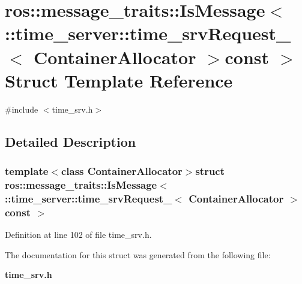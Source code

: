 \section{ros\-:\-:message\-\_\-traits\-:\-:\-Is\-Message$<$ \-:\-:time\-\_\-server\-:\-:time\-\_\-srv\-Request\-\_\-$<$ \-Container\-Allocator $>$const $>$ \-Struct \-Template \-Reference}
\label{structros_1_1message__traits_1_1IsMessage_3_01_1_1time__server_1_1time__srvRequest___3_01ContainerAllocator_01_4const_01_01_4}


{\ttfamily \#include $<$time\-\_\-srv.\-h$>$}



\subsection{\-Detailed \-Description}
\subsubsection*{template$<$class Container\-Allocator$>$struct ros\-::message\-\_\-traits\-::\-Is\-Message$<$ \-::time\-\_\-server\-::time\-\_\-srv\-Request\-\_\-$<$ Container\-Allocator $>$const  $>$}



\-Definition at line 102 of file time\-\_\-srv.\-h.



\-The documentation for this struct was generated from the following file\-:\begin{DoxyCompactItemize}
\item 
{\bf time\-\_\-srv.\-h}\end{DoxyCompactItemize}
